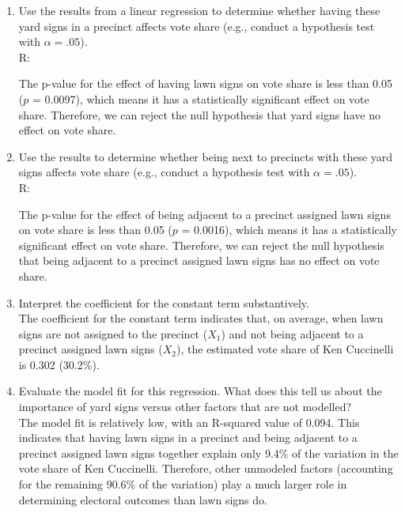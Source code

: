 \documentclass[12pt,letterpaper]{article}
\begin{document}
\vspace{.5cm}
\begin{enumerate}
	\item [(a)] Use the results from a linear regression to determine whether having these yard signs in a precinct affects vote share (e.g., conduct a hypothesis test with $\alpha = .05$).\\
	
	R:
	
	
	The p-value for the effect of having lawn signs on vote share is less than 0.05 ($p$ = 0.0097), which means it has a statistically significant effect on vote share.  Therefore, we can reject the null hypothesis that yard signs have no effect on vote share.
	
	\vspace{1cm}
	\item [(b)]  Use the results to determine whether being
	next to precincts with these yard signs affects vote
	share (e.g., conduct a hypothesis test with $\alpha = .05$).\\
	
	R:
	
	
	The p-value for the effect of being adjacent to a precinct assigned lawn signs on vote share is less than 0.05 ($p$ = 0.0016), which means it has a statistically significant effect on vote share.  Therefore, we can reject the null hypothesis that being adjacent to a precinct assigned lawn signs has no effect on vote share.
	\vspace{1cm}
	\item [(c)] Interpret the coefficient for the constant term substantively.\\
	
	The coefficient for the constant term indicates that, on average, when lawn signs are not assigned to the precinct ($X_1$) and not being adjacent to a precinct assigned lawn signs ($X_2$), the estimated vote share of Ken Cuccinelli is 0.302 (30.2\%).
	
	\vspace{1cm}
	
	\item [(d)] Evaluate the model fit for this regression.  What does this	tell us about the importance of yard signs versus other factors that are not modelled?\\
	
	The model fit is relatively low, with an R-squared value of 0.094. This indicates that having lawn signs in a precinct and being adjacent to a precinct assigned lawn signs together explain only 9.4\% of the variation in the vote share of Ken Cuccinelli. Therefore, other unmodeled factors (accounting for the remaining 90.6\% of the variation) play a much larger role in determining electoral outcomes than lawn signs do.
	
	
	
	
\end{enumerate}  
\end{document}
